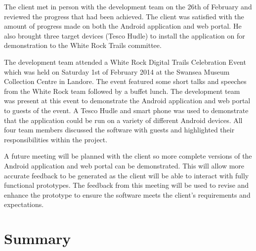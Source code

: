 \documentclass[11pt,a4paper]{article}
\begin{document}
The client met in person with the development team on the 26th of February and reviewed the progress that had been achieved. The client was satisfied with the amount of progress made on both the Android application and web portal.  He also brought three target devices (Tesco Hudle) to install the application on for demonstration to the White Rock Trails committee.

The development team attended a White Rock Digital Trails Celebration Event which was held on Saturday 1st of February 2014 at the Swansea Museum Collection Centre in Landore. The event featured some short talks and speeches from the White Rock team followed by a buffet lunch. The development team was present at this event to demonstrate the Android application and web portal to guests of the event. A Tesco Hudle and smart phone was used to demonstrate that the application could be run on a variety of different Android devices. All four team members discussed the software with guests and highlighted their responsibilities within the project.

A future meeting will be planned with the client so more complete versions of the Android application and web portal can be demonstrated. This will allow more accurate feedback to be generated as the client will be able to interact with fully functional prototypes. The feedback from this meeting will be used to revise and enhance the prototype to ensure the software meets the client's requirements and expectations.

\section{Summary}

\newpage


\end{document}
